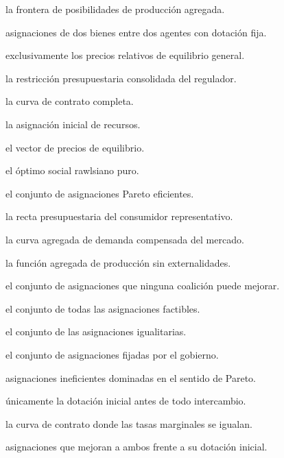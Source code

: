 \begin{opts}
    \item la frontera de posibilidades de producción agregada.
    \item asignaciones de dos bienes entre dos agentes con dotación fija.
    \item exclusivamente los precios relativos de equilibrio general.
    \item la restricción presupuestaria consolidada del regulador.
\end{opts}

\begin{opts}
    \item la curva de contrato completa.
    \item la asignación inicial de recursos.
    \item el vector de precios de equilibrio.
    \item el óptimo social rawlsiano puro.
\end{opts}

\begin{opts}
    \item el conjunto de asignaciones Pareto eficientes.
    \item la recta presupuestaria del consumidor representativo.
    \item la curva agregada de demanda compensada del mercado.
    \item la función agregada de producción sin externalidades.
\end{opts}

\begin{opts}
    \item el conjunto de asignaciones que ninguna coalición puede mejorar.
    \item el conjunto de todas las asignaciones factibles.
    \item el conjunto de las asignaciones igualitarias.
    \item el conjunto de asignaciones fijadas por el gobierno.
\end{opts}

\begin{opts}
    \item asignaciones ineficientes dominadas en el sentido de Pareto.
    \item únicamente la dotación inicial antes de todo intercambio.
    \item la curva de contrato donde las tasas marginales se igualan.
    \item asignaciones que mejoran a ambos frente a su dotación inicial.
\end{opts}

